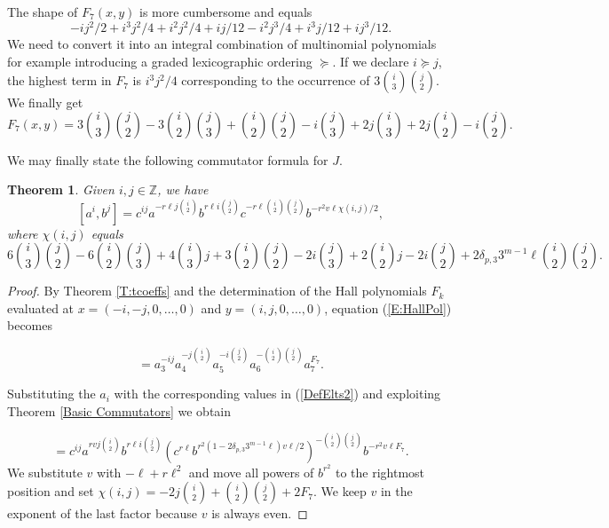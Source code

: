 \documentclass{amsart}
\newtheorem{theorem}{Theorem}[section]
\theoremstyle{definition}
\theoremstyle{remark}
\newcommand \Z{{\mathbb Z}}
\begin{document}
{The shape of $F_7(x,y)$ is more cumbersome and equals
$$
-ij^2/2 + i^3j^2/4 + i^2j^2/4 + ij/12 - i^2j^3/4 + i^3j/12 + ij^3/12.
$$
We need to convert it into an integral combination of multinomial polynomials for example introducing 
a graded lexicographic ordering $\succeq$. If we declare $i\succeq j$, the highest term in $F_7$
is $i^3j^2/4$ corresponding to the occurrence of $3\binom{i}{3}\binom{j}{2}$. We finally get
$$
F_7(x,y)=3\binom{i}{3}\binom{j}{2}-3\binom{i}{2}\binom{j}{3}+\binom{i}{2}\binom{j}{2}-i\binom{j}{3}+2j\binom{i}{3}+2j\binom{i}{2}-i\binom{j}{2}.
$$

We may finally state the following commutator formula for $J$.

\begin{theorem}
  Given $i,j\in\Z$, we have
  $$
  [a^i,b^j]=c^{ij}a^{-r\ell j\binom{i}{2}}b^{r\ell i\binom{j}{2}}c^{-r\ell\binom{i}{2}\binom{j}{2}}b^{-r^2v\ell\chi(i,j)/2},
  $$
  where $\chi(i,j)$ equals
  $$
  6\binom{i}{3}\binom{j}{2}-6\binom{i}{2}\binom{j}{3}+4\binom{i}{3}j+3\binom{i}{2}\binom{j}{2}-2i\binom{j}{3}+2\binom{i}{2}j-2i\binom{j}{2}+2\delta_{p,3}3^{m-1}\ell\binom{i}{2}\binom{j}{2}.                                                                                     
  $$
\end{theorem}

\begin{proof}
  By Theorem \ref{T:tcoeffs} and the determination of the Hall polynomials $F_k$ evaluated at $x=(-i,-j,0,\ldots,0)$ and $y=(i,j,0,\ldots,0)$, equation (\ref{E:HallPol}) becomes
  
  \begin{equation}
    [a_1^i,a_2^j]=a_3^{-ij}a_4^{-j\binom{i}{2}}a_5^{-i\binom{j}{2}}a_6^{-\binom{i}{2}\binom{j}{2}}a_7^{F_7}.\label{eq.comj.5}
  \end{equation}
  
Substituting the $a_i$ with the corresponding values in (\ref{DefElts2}) and exploiting Theorem \ref{Basic Commutators} we obtain 
  
  \begin{equation}
    [a^i,b^j]=c^{ij}a^{rv j\binom{i}{2}}b^{r\ell i\binom{j}{2}}(c^{r\ell}b^{r^2(1-2\delta_{p,3}3^{m-1}\ell)v\ell /2})^{-\binom{i}{2}\binom{j}{2}}b^{-r^2v\ell F_7}.\label{eq.comj.6}
  \end{equation}
We substitute $v$ with $-\ell+r\ell^2$ and move all powers of $b^{r^2}$ to the rightmost position and set $\chi(i,j)=-2j\binom{i}{2}+\binom{i}{2}\binom{j}{2}+2F_7$.
We keep $v$ in the exponent of the last factor because $v$ is always even.
\end{proof}

}
\end{document}
